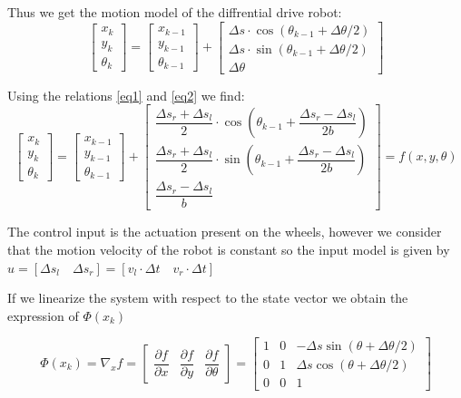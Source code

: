 \documentclass[11pt,a4paper]{report}
\begin{document}
\begin{enumerate}
Thus we get the motion model of the diffrential drive robot:
$$ \left [ \begin{array}{c} x_{k} \\ y_{k} \\ \theta_{k} \end{array}\right ]= 
\left [ \begin{array}{c} x_{k-1} \\ y_{k-1} \\ \theta_{k-1} \end{array}\right ] + 
\left [ \begin{array}{c} \Delta s \cdot \cos (\theta_{k-1} + \Delta \theta /2) \\ \Delta s \cdot \sin (\theta_{k-1} + \Delta \theta /2) \\ \Delta \theta \end{array}\right ]$$  

Using the relations \ref{eq1} and \ref{eq2} we find:
$$ \left [ \begin{array}{c} x_{k} \\ y_{k} \\ \theta_{k} \end{array}\right ]= 
\left [ \begin{array}{c} x_{k-1} \\ y_{k-1} \\ \theta_{k-1} \end{array}\right ] + 
\left [ \begin{array}{c} \dfrac{\Delta s_{r} + \Delta s_{l}}{2} \cdot \cos (\theta_{k-1} + \dfrac{\Delta s_{r} - \Delta s_{l}}{2b} ) \\ \dfrac{\Delta s_{r} + \Delta s_{l}}{2} \cdot \sin (\theta_{k-1} + \dfrac{\Delta s_{r} - \Delta s_{l}}{2b}) \\ \dfrac{\Delta s_{r} - \Delta s_{l}}{b} \end{array}\right ] = f(x, y, \theta) $$  

The control input is the actuation present on the wheels, however we consider that the motion velocity of the robot is constant so the input model is given by $ u = [\Delta s_{l} \quad \Delta s_{r}] = [v_{l} \cdot \Delta t \quad v_{r} \cdot \Delta t]$	

If we linearize the system with respect to the state vector we obtain the expression of $\Phi(x_{k})$  

$$ \Phi(x_{k}) =\nabla_{x} f=  \left [ \begin{array}{ccc} \dfrac{\partial f}{\partial x} & \dfrac{\partial f}{\partial y} & \dfrac{\partial f}{\partial \theta} \end{array}\right ] =
\left [ \begin{array}{ccc} 1 & 0 & -\Delta s \sin (\theta + \Delta \theta /2) \\ 0 & 1 & \Delta s \cos (\theta + \Delta \theta /2)\\ 0 & 0 & 1\end{array}\right ]  $$


\end{enumerate}
\end{document}
